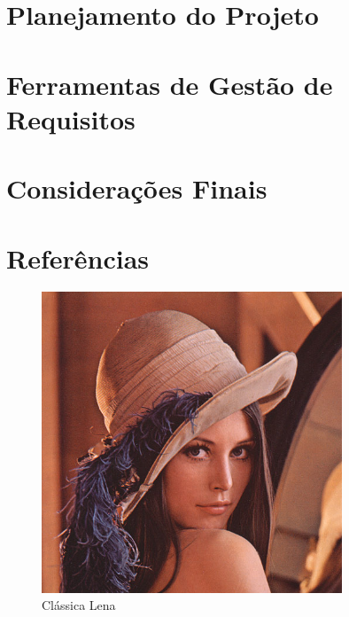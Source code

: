 \section{Planejamento do Projeto}
\label{sec:nova_sess_o}

\section{Ferramentas de Gestão de Requisitos}
\label{sec:nova_sess_o}

\section{Considerações Finais}
\label{sec:nova_sess_o}

\section{Referências}
\label{sec:nova_sess_o}




\onecolumn
\begin{usecase}



\end{usecase}
\onecolumn

\onecolumn
\begin{figure}[h]
  \begin{center}
    \includegraphics[width=0.8\textwidth]{conteudo/lena}
    \caption{Clássica Lena}
  \end{center}
\end{figure}
\onecolumn

